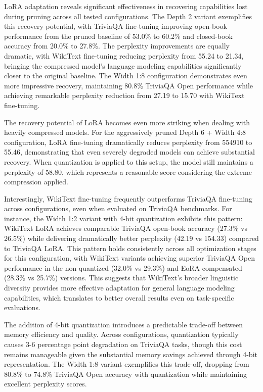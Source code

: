 LoRA adaptation reveals significant effectiveness in recovering capabilities lost during pruning across all tested configurations. The Depth 2 variant exemplifies this recovery potential, with TriviaQA fine-tuning improving open-book performance from the pruned baseline of 53.0\% to 60.2\% and closed-book accuracy from 20.0\% to 27.8\%. The perplexity improvements are equally dramatic, with WikiText fine-tuning reducing perplexity from 55.24 to 21.34, bringing the compressed model's language modeling capabilities significantly closer to the original baseline. The Width 1:8 configuration demonstrates even more impressive recovery, maintaining 80.8\% TriviaQA Open performance while achieving remarkable perplexity reduction from 27.19 to 15.70 with WikiText fine-tuning.

The recovery potential of LoRA becomes even more striking when dealing with heavily compressed models. For the aggressively pruned Depth 6 + Width 4:8 configuration, LoRA fine-tuning dramatically reduces perplexity from 554910 to 55.46, demonstrating that even severely degraded models can achieve substantial recovery. When quantization is applied to this setup, the model still maintains a perplexity of 58.80, which represents a reasonable score considering the extreme compression applied.

Interestingly, WikiText fine-tuning frequently outperforms TriviaQA fine-tuning across configurations, even when evaluated on TriviaQA benchmarks. For instance, the Width 1:2 variant with 4-bit quantization exhibits this pattern: WikiText LoRA achieves comparable TriviaQA open-book accuracy (27.3\% vs 26.5\%) while delivering dramatically better perplexity (42.19 vs 154.33) compared to TriviaQA LoRA. This pattern holds consistently across all optimization stages for this configuration, with WikiText variants achieving superior TriviaQA Open performance in the non-quantized (32.0\% vs 29.3\%) and EoRA-compensated (28.3\% vs 25.7\%) versions. This suggests that WikiText's broader linguistic diversity provides more effective adaptation for general language modeling capabilities, which translates to better overall results even on task-specific evaluations.

The addition of 4-bit quantization introduces a predictable trade-off between memory efficiency and quality. Across configurations, quantization typically causes 3-6 percentage point degradation on TriviaQA tasks, though this cost remains manageable given the substantial memory savings achieved through 4-bit representation. The Width 1:8 variant exemplifies this trade-off, dropping from 80.8\% to 74.8\% TriviaQA Open accuracy with quantization while maintaining excellent perplexity scores.

